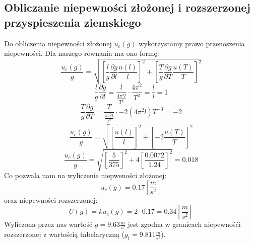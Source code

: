 \documentclass{fizraport}
\begin{document}
\subsection{Obliczanie niepewności złożonej i rozszerzonej przyspieszenia ziemskiego}
Do obliczenia niepewności złożonej $u_c(g)$ wykorzystamy prawo przenoszenia niepewności.
Dla naszego równania ma ono formę:
\[\frac{u_c(g)}{g} = \sqrt{ \left[\frac{l}{g}\frac{\partial g}{\partial l}\frac{u(l)}{l}\right]^2+ \left[\frac{T}{g}\frac{\partial g}{\partial T}\frac{u(T)}{T}\right]^2 }
\]
\[\frac{l}{g}\frac{\partial g}{\partial l} = \frac{l}{\frac{4\pi^2 l}{T^2}}\cdot\frac{4\pi^2}{T^2} = \frac{l}{l}=1\]
\[\frac{T}{g}\frac{\partial g}{\partial T} = \frac{T}{\frac{4\pi^2 l}{T^2}}\cdot-2(4\pi^2l)T^{-3}=-2\]
\[\frac{u_c(g)}{g} = \sqrt{ \left[\frac{u(l)}{l}\right]^2+ \left[-2\frac{u(T)}{T}\right]^2 }\]
\[\frac{u_c(g)}{g} = \sqrt{ \left[\frac{5}{375}\right]^2+ 4\left[\frac{0.0072}{1.24}\right]^2 } = 0.018\]
Co pozwala nam na wyliczenie niepweności złożonej:
\[u_c(g) = 0.17 \left[\frac{m}{s^2}\right] \]
oraz niepewności rozszerzonej:
\[U(g) =k u_c(g) =2 \cdot 0.17 = 0.34\left[\frac{m}{s^2}\right] \]
Wyliczona przez nas wartość $g=9.63 \frac{m}{s^2} $ jest zgodna w granicach niepewnośći rozszerzonej z wartością tabelaryczną ($ g_t = 9.811 \frac{m}{s^2}$).
\pagebreak
\end{document}
